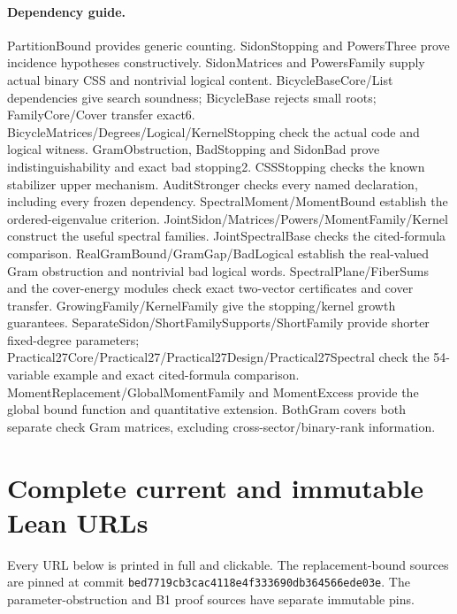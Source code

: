 \paragraph{Dependency guide.} PartitionBound provides generic counting. SidonStopping and PowersThree prove incidence hypotheses constructively. SidonMatrices and PowersFamily supply actual binary CSS and nontrivial logical content. BicycleBaseCore/List dependencies give search soundness; BicycleBase rejects small roots; FamilyCore/Cover transfer exact6. BicycleMatrices/Degrees/Logical/KernelStopping check the actual code and logical witness. GramObstruction, BadStopping and SidonBad prove indistinguishability and exact bad stopping2. CSSStopping checks the known stabilizer upper mechanism. AuditStronger checks every named declaration, including every frozen dependency. SpectralMoment/MomentBound establish the ordered-eigenvalue criterion. JointSidon/Matrices/Powers/MomentFamily/Kernel construct the useful spectral families. JointSpectralBase checks the cited-formula comparison. RealGramBound/GramGap/BadLogical establish the real-valued Gram obstruction and nontrivial bad logical words. SpectralPlane/FiberSums and the cover-energy modules check exact two-vector certificates and cover transfer. GrowingFamily/KernelFamily give the stopping/kernel growth guarantees. SeparateSidon/ShortFamilySupports/ShortFamily provide shorter fixed-degree parameters; Practical27Core/Practical27/Practical27Design/Practical27Spectral check the 54-variable example and exact cited-formula comparison. MomentReplacement/GlobalMomentFamily and MomentExcess provide the global bound function and quantitative extension. BothGram covers both separate check Gram matrices, excluding cross-sector/binary-rank information.
\clearpage\section{Complete current and immutable Lean URLs}\label{app:links}
Every URL below is printed in full and clickable. The replacement-bound sources are pinned at commit \texttt{bed7719cb3cac4118e4f333690db364566ede03e}. The parameter-obstruction and B1 proof sources have separate immutable pins.

